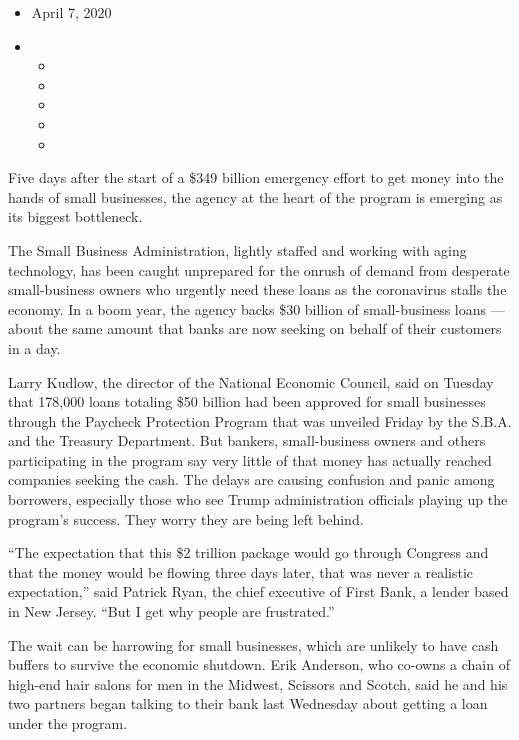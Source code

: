 \begin{itemize}
\item
  April 7, 2020
\item
  \begin{itemize}
  \item
  \item
  \item
  \item
  \item
  \end{itemize}
\end{itemize}

Five days after the start of a \$349 billion emergency effort to get
money into the hands of small businesses, the agency at the heart of the
program is emerging as its biggest bottleneck.

The Small Business Administration, lightly staffed and working with
aging technology, has been caught unprepared for the onrush of demand
from desperate small-business owners who urgently need these loans as
the coronavirus stalls the economy. In a boom year, the agency backs
\$30 billion of small-business loans --- about the same amount that
banks are now seeking on behalf of their customers in a day.

Larry Kudlow, the director of the National Economic Council, said on
Tuesday that 178,000 loans totaling \$50 billion had been approved for
small businesses through the Paycheck Protection Program that was
unveiled Friday by the S.B.A. and the Treasury Department. But bankers,
small-business owners and others participating in the program say very
little of that money has actually reached companies seeking the cash.
The delays are causing confusion and panic among borrowers, especially
those who see Trump administration officials playing up the program's
success. They worry they are being left behind.

``The expectation that this \$2 trillion package would go through
Congress and that the money would be flowing three days later, that was
never a realistic expectation,'' said Patrick Ryan, the chief executive
of First Bank, a lender based in New Jersey. ``But I get why people are
frustrated.''

The wait can be harrowing for small businesses, which are unlikely to
have cash buffers to survive the economic shutdown. Erik Anderson, who
co-owns a chain of high-end hair salons for men in the Midwest, Scissors
and Scotch, said he and his two partners began talking to their bank
last Wednesday about getting a loan under the program.

